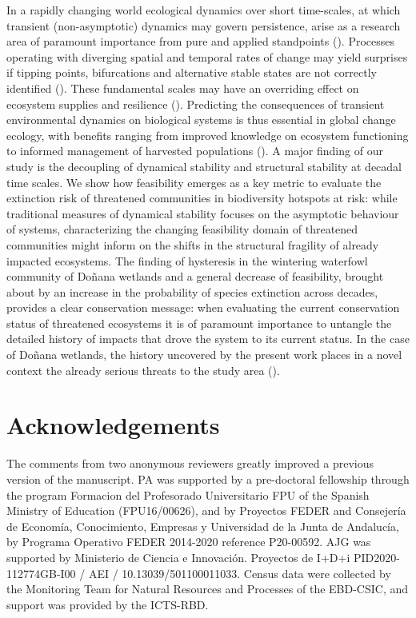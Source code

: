 \documentclass[12pt]{article}
\begin{document}
In a rapidly changing world ecological dynamics over short time-scales, at which transient (non-asymptotic) dynamics may govern persistence, arise as a research area of paramount importance from pure and applied standpoints (\cite{Hastings2018}). Processes operating with diverging spatial and temporal rates of change may yield surprises if tipping points, bifurcations and alternative stable states are not correctly identified (\cite{Watts2020,Williams2021a,Scheffer2009a}). These fundamental scales may have an overriding effect on ecosystem supplies and resilience (\cite{Folke2004b,Scheffer2009a}). Predicting the consequences of transient environmental dynamics on biological systems is thus essential in global change ecology, with benefits ranging from improved knowledge on ecosystem functioning to informed management of harvested populations (\cite{Suding2004a,Scheffer2009a,Francis2021}). A major finding of our study is the decoupling of dynamical stability and structural stability at decadal time scales. We show how feasibility emerges as a key metric to evaluate the extinction risk of threatened communities in biodiversity hotspots at risk: while traditional measures of dynamical stability focuses on the asymptotic behaviour of systems, characterizing the changing feasibility domain of threatened communities might inform on the shifts in the structural fragility of already impacted ecosystems. The finding of hysteresis in the wintering waterfowl community of Doñana wetlands and a general decrease of feasibility, brought about by an increase in the probability of species extinction across decades, provides a clear conservation message: when evaluating the current conservation status of threatened ecosystems it is of paramount importance to untangle the detailed history of impacts that drove the system to its current status. In the case of Doñana wetlands, the history uncovered by the present work places in a novel context the already serious threats to the study area (\cite{Scheffer2015a,Camacho2022,DeFelipe2023a,Santamaria2023}). \\

\section*{Acknowledgements}
The comments from two anonymous reviewers greatly improved a previous version of the manuscript. PA was supported by a pre-doctoral fellowship through the program Formacion del Profesorado Universitario FPU of the Spanish Ministry of Education (FPU16/00626), and by Proyectos FEDER and Consejería de Economía, Conocimiento, Empresas y Universidad de la Junta de Andalucía, by Programa Operativo FEDER 2014-2020 reference P20-00592. AJG was supported by Ministerio de Ciencia e Innovación. Proyectos de I+D+i PID2020-112774GB-I00 / AEI / 10.13039/501100011033. Census data were collected by the Monitoring Team for Natural Resources and Processes of the EBD-CSIC, and support was provided by the ICTS-RBD.\\
\end{document}
